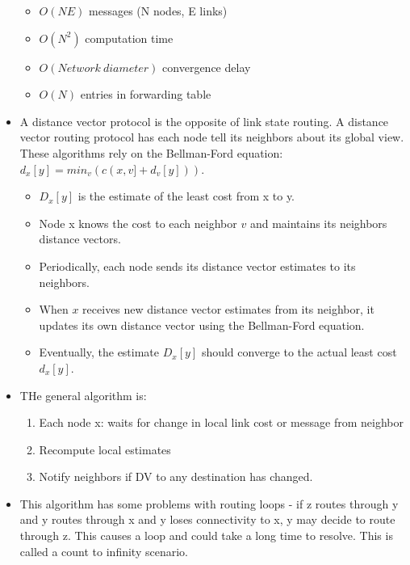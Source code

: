 \documentclass[]{article}
\providecommand{\tightlist}{%
  \setlength{\itemsep}{0pt}\setlength{\parskip}{0pt}}
\begin{document}
\begin{itemize}
  \begin{itemize}
  \tightlist
  \item
    \(O(NE)\) messages (N nodes, E links)
  \item
    \(O(N^2)\) computation time
  \item
    \(O(Network \ diameter)\) convergence delay
  \item
    \(O(N)\) entries in forwarding table
  \end{itemize}
\item
  A distance vector protocol is the opposite of link state routing. A
  distance vector routing protocol has each node tell its neighbors
  about its global view. These algorithms rely on the Bellman-Ford
  equation: \(d_x[y] = min_v(c(x, v] + d_v[y]))\).

  \begin{itemize}
  \tightlist
  \item
    \(D_x[y]\) is the estimate of the least cost from x to y.
  \item
    Node x knows the cost to each neighbor \(v\) and maintains its
    neighbors distance vectors.
  \item
    Periodically, each node sends its distance vector estimates to its
    neighbors.
  \item
    When \(x\) receives new distance vector estimates from its neighbor,
    it updates its own distance vector using the Bellman-Ford equation.
  \item
    Eventually, the estimate \(D_x[y]\) should converge to the actual
    least cost \(d_x[y]\).
  \end{itemize}
\item
  THe general algorithm is:

  \begin{enumerate}
  \def\labelenumi{\arabic{enumi}.}
  \tightlist
  \item
    Each node x: waits for change in local link cost or message from
    neighbor
  \item
    Recompute local estimates
  \item
    Notify neighbors if DV to any destination has changed.
  \end{enumerate}
\item
  This algorithm has some problems with routing loops - if z routes
  through y and y routes through x and y loses connectivity to x, y may
  decide to route through z. This causes a loop and could take a long
  time to resolve. This is called a count to infinity scenario.


\end{itemize}
\end{document}
